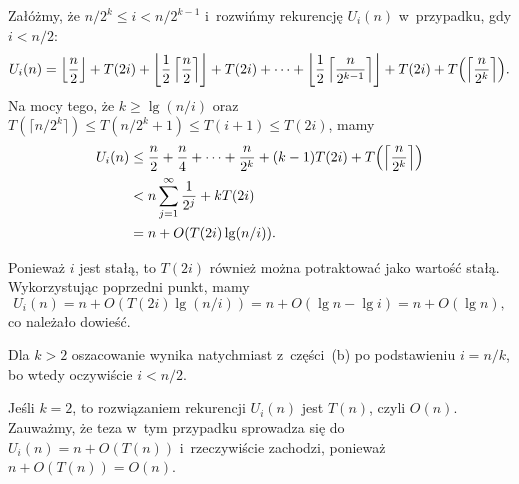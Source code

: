 \subproblem %
Załóżmy, że $n/2^k\le i<n/2^{k-1}$ i~rozwińmy rekurencję $U_i(n)$ w~przypadku, gdy $i<n/2$:
\[
	U_i(n) = \left\lfloor\frac{n}{2}\right\rfloor+T(2i)+\left\lfloor\frac{1}{2}\left\lceil\frac{n}{2}\right\rceil\right\rfloor+T(2i)+\cdots+\left\lfloor\frac{1}{2}\left\lceil\frac{n}{2^{k-1}}\right\rceil\right\rfloor+T(2i)+T\Bigl(\left\lceil\frac{n}{2^k}\right\rceil\Bigr).
\]
Na mocy tego, że $k\ge\lg(n/i)$ oraz $T(\lceil n/2^k\rceil)\le T(n/2^k+1)\le T(i+1)\le T(2i)$, mamy
\begin{align*}
	U_i(n) &\le \frac{n}{2}+\frac{n}{4}+\cdots+\frac{n}{2^k}+(k-1)T(2i)+T\Bigl(\left\lceil\frac{n}{2^k}\right\rceil\Bigr) \\
	&< n\sum_{j=1}^\infty\frac{1}{2^j}+kT(2i) \\
	&= n+O(T(2i)\lg(n/i)).
\end{align*}

\subproblem %
Ponieważ $i$ jest stałą, to $T(2i)$ również można potraktować jako wartość stałą. Wykorzystując poprzedni punkt, mamy
\[
	U_i(n) = n+O(T(2i)\lg(n/i)) = n+O(\lg n-\lg i) = n+O(\lg n),
\]
co należało dowieść.

\subproblem %
Dla $k>2$ oszacowanie wynika natychmiast z~części~(b) po podstawieniu $i=n/k$, bo wtedy oczywiście $i<n/2$.

Jeśli $k=2$, to rozwiązaniem rekurencji $U_i(n)$ jest $T(n)$, czyli $O(n)$. Zauważmy, że teza w~tym przypadku sprowadza się do $U_i(n)=n+O(T(n))$ i~rzeczywiście zachodzi, ponieważ $n+O(T(n))=O(n)$.

\endinput
